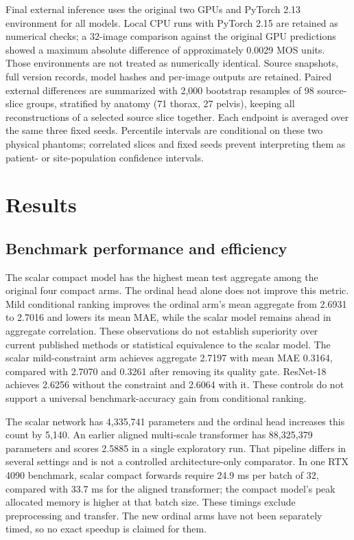 \documentclass[11pt]{article}
\begin{document}
Final external inference uses the original two GPUs and PyTorch 2.13 environment for all models. Local CPU runs with PyTorch 2.15 are retained as numerical checks; a 32-image comparison against the original GPU predictions showed a maximum absolute difference of approximately 0.0029 MOS units. Those environments are not treated as numerically identical. Source snapshots, full version records, model hashes and per-image outputs are retained. Paired external differences are summarized with 2,000 bootstrap resamples of 98 source-slice groups, stratified by anatomy (71 thorax, 27 pelvis), keeping all reconstructions of a selected source slice together. Each endpoint is averaged over the same three fixed seeds. Percentile intervals are conditional on these two physical phantoms; correlated slices and fixed seeds prevent interpreting them as patient- or site-population confidence intervals.
\section{Results}

\subsection{Benchmark performance and efficiency}
The scalar compact model has the highest mean test aggregate among the original four compact arms. The ordinal head alone does not improve this metric. Mild conditional ranking improves the ordinal arm's mean aggregate from 2.6931 to 2.7016 and lowers its mean MAE, while the scalar model remains ahead in aggregate correlation. These observations do not establish superiority over current published methods or statistical equivalence to the scalar model. The scalar mild-constraint arm achieves aggregate 2.7197 with mean MAE 0.3164, compared with 2.7070 and 0.3261 after removing its quality gate. ResNet-18 achieves 2.6256 without the constraint and 2.6064 with it. These controls do not support a universal benchmark-accuracy gain from conditional ranking.

The scalar network has 4,335,741 parameters and the ordinal head increases this count by 5,140. An earlier aligned multi-scale transformer has 88,325,379 parameters and scores 2.5885 in a single exploratory run. That pipeline differs in several settings and is not a controlled architecture-only comparator. In one RTX 4090 benchmark, scalar compact forwards require 24.9 ms per batch of 32, compared with 33.7 ms for the aligned transformer; the compact model's peak allocated memory is higher at that batch size. These timings exclude preprocessing and transfer. The new ordinal arms have not been separately timed, so no exact speedup is claimed for them.
\end{document}
